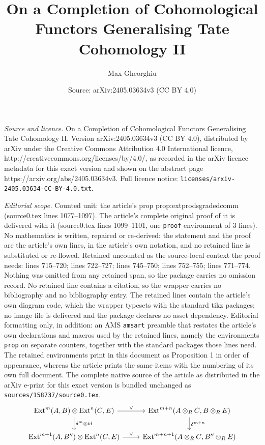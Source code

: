 \documentclass[10pt,a4paper]{amsart}
\title{On a Completion of Cohomological Functors Generalising Tate Cohomology II}
\author{Max Gheorghiu}
\date{Source: arXiv:2405.03634v3 (CC BY 4.0)}
\begin{document}
\maketitle

\noindent\emph{Source and licence.} On a Completion of Cohomological Functors Generalising Tate Cohomology II. Version arXiv:2405.03634v3 (CC BY 4.0), distributed by arXiv under the Creative Commons Attribution 4.0 International licence, http://creativecommons.org/licenses/by/4.0/, as recorded in the arXiv licence metadata for this exact version and shown on the abstract page https://arxiv.org/abs/2405.03634v3. Full licence notice: \texttt{licenses/arxiv-2405.03634-CC-BY-4.0.txt}.\par\smallskip

\noindent\textit{Editorial scope.} Counted unit: the article's prop prop:extprodsgradedcomm (source0.tex lines 1077--1097). The article's complete original proof of it is delivered with it (source0.tex lines 1099--1101, one \texttt{proof} environment of 3 lines). No mathematics is written, repaired or re-derived: the statement and the proof are the article's own lines, in the article's own notation, and no retained line is substituted or re-flowed.  Retained uncounted as the source-local context the proof needs: lines 715--720; lines 722--727; lines 745--750; lines 752--755; lines 771--774.  Nothing was omitted from any retained span, so the package carries no omission record.  No retained line contains a citation, so the wrapper carries no bibliography and no bibliography entry.  The retained lines contain the article's own diagram code, which the wrapper typesets with the standard tikz packages; no image file is delivered and the package declares no asset dependency.  Editorial formatting only, in addition: an AMS \texttt{amsart} preamble that restates the article's own declarations and macros used by the retained lines, namely the environments \texttt{prop} on separate counters, together with the standard packages those lines need.  The retained environments print in this document as Proposition 1 in order of appearance, whereas the article prints the same items with the numbering of its own full document.  The complete native source of the article as distributed in the arXiv e-print for this exact version is bundled unchanged as \texttt{sources/158737/source0.tex}.
\begin{equation}\label{diag:extandconnfirst}
\begin{tikzcd}
    \mathrm{Ext}^m(A{,} \, B) \otimes \mathrm{Ext}^n(C{,} \, E) \arrow[r, "\vee"] \arrow[d, "\delta^m \otimes \mathrm{id}"] & \mathrm{Ext}^{m+n}(A \otimes_R C{,} \, B \otimes_R E) \arrow[d, "\delta^{m+n}"] \\
    \mathrm{Ext}^{m+1}(A{,} \, B'') \otimes \mathrm{Ext}^n(C{,} \, E) \arrow[r, "\vee"] & \mathrm{Ext}^{m+n+1}(A \otimes_R C{,} \, B'' \otimes_R E)
\end{tikzcd}
\end{equation}
\end{document}

